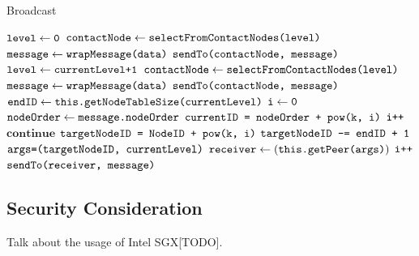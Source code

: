 \begin{algorithm}
	\caption{Broadcast}\label{euclid}
	\begin{algorithmic}[1]
		\State $\texttt{level} \gets \texttt{0}$
		\State $\texttt{contactNode} \gets \texttt{selectFromContactNodes(level)}$
		\State $\texttt{message} \gets \texttt{wrapMessage(data)}$
		\State $\texttt{sendTo(contactNode, message)}$
		\EndFunction
		\\
		\State $\texttt{level} \gets \texttt{currentLevel+1}$
		\State $\texttt{contactNode} \gets \texttt{selectFromContactNodes(level)}$
		\State $\texttt{message} \gets \texttt{wrapMessage(data)}$
		\State $\texttt{sendTo(contactNode, message)}$
		\EndFunction
		\\
		\State $\texttt{endID} \gets \texttt{this.getNodeTableSize(currentLevel)}$
		\State $\texttt{i} \gets \texttt{0}$
		\State $\texttt{nodeOrder} \gets \texttt{message.nodeOrder}$
		\State $\texttt{currentID = nodeOrder + pow(k, i)}$
			\State $\texttt{i++}$
			\State $\textbf{continue}$
			\Else
			\State $\texttt{targetNodeID = NodeID + pow(k, i)}$
			\State $\texttt{targetNodeID -= endID + 1}$
			\EndIf
			\State $\texttt{args=(targetNodeID, currentLevel)}$
			\State $\texttt{receiver} \gets (\texttt{this.getPeer(args)})$
			\State $\texttt{i++}$
			\State $\texttt{sendTo(receiver, message)}$
			\EndIf
		\EndWhile
		\EndFunction
	\end{algorithmic}
\end{algorithm}

\subsection{Security Consideration} \label{security}

Talk about the usage of Intel SGX[TODO].

